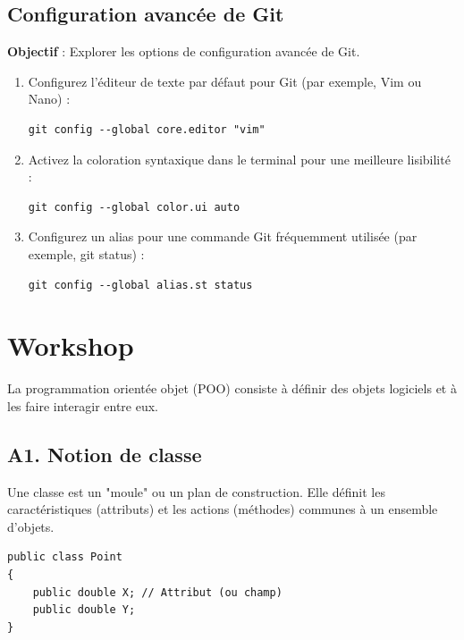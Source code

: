 \subsection*{Configuration avancée de Git}
{}
\noindent \textbf{Objectif} : Explorer les options de configuration avancée de Git.
\begin{enumerate}
	\item Configurez l'éditeur de texte par défaut pour Git (par exemple, Vim ou Nano) :
	\begin{verbatim}
git config --global core.editor "vim"
	\end{verbatim}
	\item Activez la coloration syntaxique dans le terminal pour une meilleure lisibilité :
	\begin{verbatim}
git config --global color.ui auto
	\end{verbatim}
	\item Configurez un alias pour une commande Git fréquemment utilisée (par exemple, git status) :
	\begin{verbatim}
git config --global alias.st status
	\end{verbatim}
\end{enumerate}

\newpage

\section*{Workshop}

La programmation orientée objet (POO) consiste à définir des objets logiciels et à les faire interagir entre eux.

\subsection*{A1. Notion de classe}
{}
\noindent Une classe est un "moule" ou un plan de construction. Elle définit les caractéristiques (attributs) et les actions (méthodes) communes à un ensemble d'objets.

\vspace{0.5cm}

\begin{verbatim}
public class Point 
{
    public double X; // Attribut (ou champ)
    public double Y;
}
\end{verbatim}

